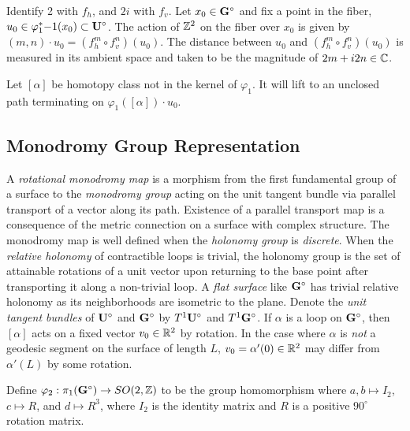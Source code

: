 \documentclass[]{article}
\begin{document}
\begin{figure}[H]
\centering

\end{figure}

Identify 2 with $f_h$, and $2i$ with $f_v$. Let $x_0\in\mathbf{G}^\circ$ and fix a point in the fiber,  $u_0\in\varphi_1^*{-1}(x_0)\subset\mathbf{U}^\circ$. The action of $\mathbb{Z}^2$ on the fiber over $x_0$ is given by $(m,n)\cdot u_0=(f_h^m\circ f_v^n)(u_0)$. The distance between $u_0$ and $(f_h^m\circ f_v^n)(u_0)$ is measured in its ambient space and taken to be the magnitude of $2m+i2n\in\mathbb{C}$. 

\begin{lem}
Let $[\alpha]$ be homotopy class not in the kernel of $\varphi_1$. It will lift to an unclosed path terminating on $\varphi_1([\alpha])\cdot u_0$.
\end{lem}

\subsection{Monodromy Group Representation}
A \emph{rotational monodromy map} is a morphism from the first fundamental group of a surface to the \emph{monodromy group} acting on the unit tangent bundle via parallel transport of a vector along its path. Existence of a parallel transport map is a consequence of the metric connection on a surface with complex structure. The monodromy map is well defined when the \emph{holonomy group} is \emph{discrete}. When the \emph{relative holonomy} of contractible loops is trivial, the holonomy group is the set of attainable rotations of a unit vector upon returning to the base point after transporting it along a non-trivial loop. A \emph{flat surface} like $\mathbf{G}^\circ$ has trivial relative holonomy as its neighborhoods are isometric to the plane. Denote the \emph{unit tangent bundles} of $\mathbf{U}^\circ$ and $\mathbf{G}^\circ$ by $T^1\mathbf{U}^\circ$ and $T^1\mathbf{G}^\circ$. If $\alpha$ is a loop on $\mathbf{G}^\circ$, then $[\alpha]$ acts on a fixed vector $v_0\in\mathbb{R}^2$ by rotation. In the case where $\alpha$ is \emph{not} a geodesic segment on the surface of length $L$, $v_0=\alpha'(0)\in\mathbb{R}^2$ may differ from $\alpha'(L)$ by some rotation.

\begin{Def}
Define $\varphi_2:\pi_1(\mathbf{G}^\circ)\rightarrow SO(2,\mathbb{Z})$ to be the group homomorphism where $a,b \mapsto I_2$, $c  \mapsto R$, and $d  \mapsto R^3$, where $I_2$ is the identity matrix and $R$ is a positive $90^\circ$ rotation matrix.
\end{Def}
\end{document}

